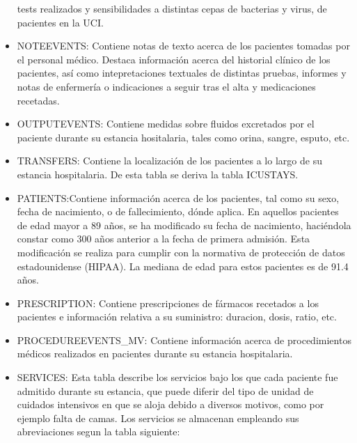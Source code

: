 \documentclass{report}
\begin{document}
\begin{itemize}
  tests realizados y sensibilidades a distintas cepas de bacterias y
  virus, de pacientes en la UCI. 
\item
  NOTEEVENTS: Contiene notas de texto acerca de los pacientes tomadas
  por el personal médico. Destaca información acerca del historial
  clínico de los pacientes, así como intepretaciones textuales de
  distintas pruebas, informes y notas de enfermería o indicaciones a
  seguir tras el alta y medicaciones recetadas. 
\item
  OUTPUTEVENTS: Contiene medidas sobre fluidos excretados por el
  paciente durante su estancia hositalaria, tales como orina, sangre,
  esputo, etc. 
\item
  TRANSFERS: Contiene la localización de los pacientes a lo largo de su
  estancia hospitalaria. De esta tabla se deriva la tabla ICUSTAYS. 
\item
  PATIENTS:Contiene información acerca de los pacientes, tal como su
  sexo, fecha de nacimiento, o de fallecimiento, dónde aplica. En
  aquellos pacientes de edad mayor a 89 años, se ha modificado su fecha
  de nacimiento, haciéndola constar como 300 años anterior a la fecha de
  primera admisión. Esta modificación se realiza para cumplir con la
  normativa de protección de datos estadounidense (HIPAA). La mediana de
  edad para estos pacientes es de 91.4 años. 
\item
  PRESCRIPTION: Contiene prescripciones de fármacos recetados a los
  pacientes e información relativa a su suministro: duracion, dosis,
  ratio, etc.
\item
  PROCEDUREEVENTS\_MV: Contiene información acerca de procedimientos
  médicos realizados en pacientes durante su estancia hospitalaria.
\item
  SERVICES: Esta tabla describe los servicios bajo los que cada paciente
  fue admitido durante su estancia, que puede diferir del tipo de unidad
  de cuidados intensivos en que se aloja debido a diversos motivos, como
  por ejemplo falta de camas. Los servicios se almacenan empleando sus
  abreviaciones segun la tabla siguiente:
\end{itemize}
\end{document}
